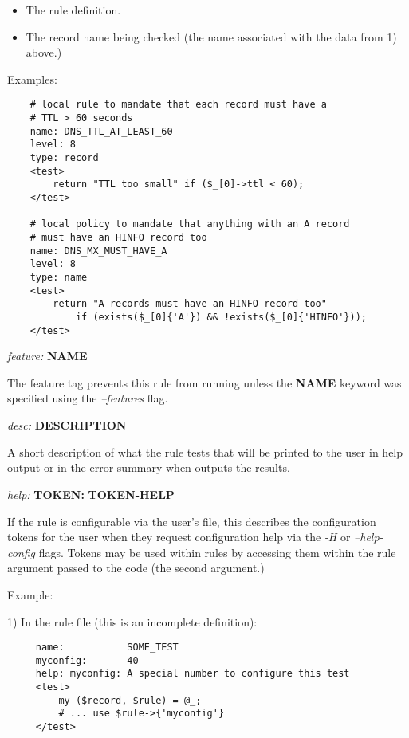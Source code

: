 \begin{description}
\begin{description}
\begin{itemize}
\item The rule definition.

\item The record name being checked (the name associated with the data from 1)
above.)

\end{itemize}

\end{description}

Examples:

\begin{verbatim}
    # local rule to mandate that each record must have a
    # TTL > 60 seconds
    name: DNS_TTL_AT_LEAST_60
    level: 8
    type: record
    <test>
        return "TTL too small" if ($_[0]->ttl < 60);
    </test>

    # local policy to mandate that anything with an A record
    # must have an HINFO record too
    name: DNS_MX_MUST_HAVE_A
    level: 8
    type: name
    <test>
        return "A records must have an HINFO record too"
            if (exists($_[0]{'A'}) && !exists($_[0]{'HINFO'}));
    </test>

\end{verbatim}

\item {\it feature:} {\bf NAME}\verb" "

The feature tag prevents this rule from running unless the {\bf NAME}
keyword was specified using the {\it --features} flag.

\item {\it desc:} {\bf DESCRIPTION}\verb" "

A short description of what the rule tests that will be printed to the
user in help output or in the error summary when  outputs the
results.

\item {\it help:} {\bf TOKEN:} {\bf TOKEN-HELP}\verb" "

If the rule is configurable via the user's  file, this
describes the configuration tokens for the user when they request
configuration help via the {\it -H} or {\it --help-config} flags.  Tokens may be
used within rules by accessing them within the rule argument passed to
the code (the second argument.)

Example:

1) In the rule file (this is an incomplete definition):

\begin{verbatim}
     name:           SOME_TEST
     myconfig:       40
     help: myconfig: A special number to configure this test
     <test>
         my ($record, $rule) = @_;
         # ... use $rule->{'myconfig'}
     </test>
\end{verbatim}


\end{description}
